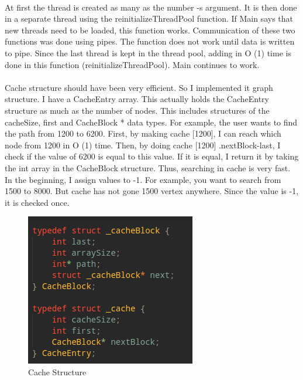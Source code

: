 \documentclass[a4paper,12pt]{report}
\begin{document}
\paragraph{}
At first the thread is created as many as the number -s argument. It is then done in a separate thread using the reinitializeThreadPool function. If Main says that new threads need to be loaded, this function works. Communication of these two functions was done using pipes. The function does not work until data is written to pipe. Since the last thread is kept in the thread pool, adding in O (1) time is done in this function (reinitializeThreadPool). Main continues to work.

\paragraph{}
Cache structure should have been very efficient. So I implemented it graph structure. I have a CacheEntry array. This actually holds the CacheEntry structure as much as the number of nodes. This includes structures of the cacheSize, first and CacheBlock * data types. For example, the user wants to find the path from 1200 to 6200. First, by making cache [1200], I can reach which node from 1200 in O (1) time. Then, by doing cache [1200] .nextBlock-last, I check if the value of 6200 is equal to this value. If it is equal, I return it by taking the int array in the CacheBlock structure. Thus, searching in cache is very fast. In the beginning, I assign values to -1. For example, you want to search from 1500 to 8000. But cache has not gone 1500 vertex anywhere. Since the value is -1, it is checked once.

\newpage
\begin{figure}[h!]
\centering
\includegraphics[scale=1.0]{4_cache1.png}
\caption{Cache Structure}
\label{fig:compile}
\end{figure}
\end{document}
